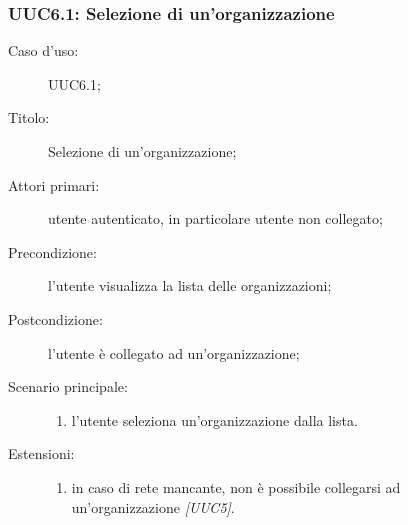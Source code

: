 \documentclass[../../../analisi-dei-requisiti.tex]{subfiles}
\begin{document}
\subsubsection{UUC6.1: Selezione di un'organizzazione}%
\label{subs:UUC6.1}
\begin{description}
  \item[Caso d’uso:] UUC6.1;
  \item[Titolo:] Selezione di un'organizzazione;
  \item[Attori primari:] utente autenticato, in particolare utente non collegato;
  \item[Precondizione:] l'utente visualizza la lista delle organizzazioni;
  \item[Postcondizione:] l'utente è collegato ad un'organizzazione;
  \item[Scenario principale:]
        \begin{enumerate}
          \item l'utente seleziona un'organizzazione dalla lista.
        \end{enumerate}
  \item[Estensioni:]
        \begin{enumerate}
          \item in caso di rete mancante, non è possibile collegarsi ad un'organizzazione \emph{[UUC5]}.
        \end{enumerate}
\end{description}
\end{document}
